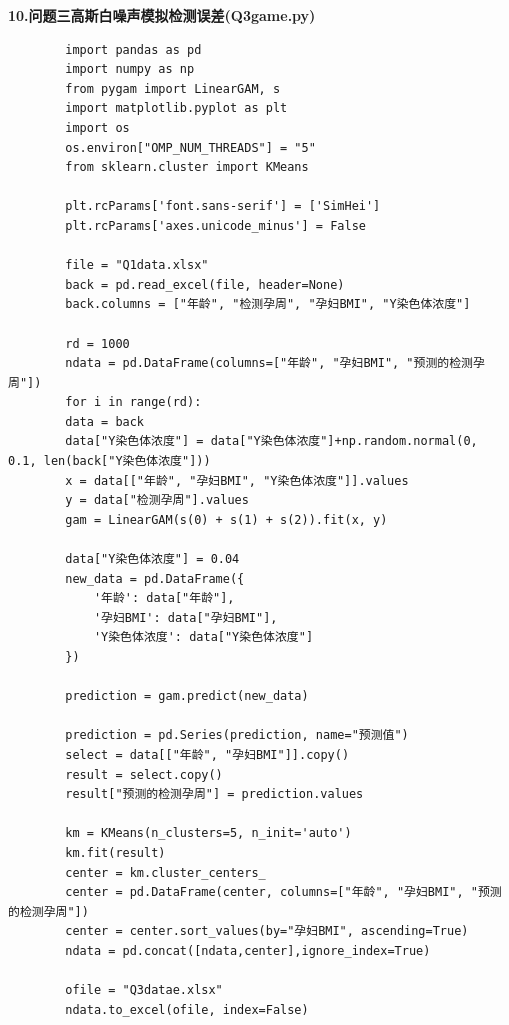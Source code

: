 \documentclass[12pt]{ctexart}
\begin{document}
	\noindent \textbf{\heiti 10.问题三高斯白噪声模拟检测误差(Q3game.py)}
	\begin{verbatim}
		import pandas as pd
		import numpy as np
		from pygam import LinearGAM, s
		import matplotlib.pyplot as plt
		import os
		os.environ["OMP_NUM_THREADS"] = "5"
		from sklearn.cluster import KMeans
		
		plt.rcParams['font.sans-serif'] = ['SimHei']  
		plt.rcParams['axes.unicode_minus'] = False
		
		file = "Q1data.xlsx"
		back = pd.read_excel(file, header=None)
		back.columns = ["年龄", "检测孕周", "孕妇BMI", "Y染色体浓度"]
		
		rd = 1000
		ndata = pd.DataFrame(columns=["年龄", "孕妇BMI", "预测的检测孕周"])
		for i in range(rd):
		data = back
		data["Y染色体浓度"] = data["Y染色体浓度"]+np.random.normal(0, 0.1, len(back["Y染色体浓度"]))
		x = data[["年龄", "孕妇BMI", "Y染色体浓度"]].values
		y = data["检测孕周"].values
		gam = LinearGAM(s(0) + s(1) + s(2)).fit(x, y)
		
		data["Y染色体浓度"] = 0.04
		new_data = pd.DataFrame({
			'年龄': data["年龄"],
			'孕妇BMI': data["孕妇BMI"],
			'Y染色体浓度': data["Y染色体浓度"]
		})
		
		prediction = gam.predict(new_data)
		
		prediction = pd.Series(prediction, name="预测值")
		select = data[["年龄", "孕妇BMI"]].copy()
		result = select.copy()
		result["预测的检测孕周"] = prediction.values
		
		km = KMeans(n_clusters=5, n_init='auto')
		km.fit(result)
		center = km.cluster_centers_
		center = pd.DataFrame(center, columns=["年龄", "孕妇BMI", "预测的检测孕周"])
		center = center.sort_values(by="孕妇BMI", ascending=True)
		ndata = pd.concat([ndata,center],ignore_index=True)
		
		ofile = "Q3datae.xlsx"
		ndata.to_excel(ofile, index=False)
	\end{verbatim}
	
\end{document}
